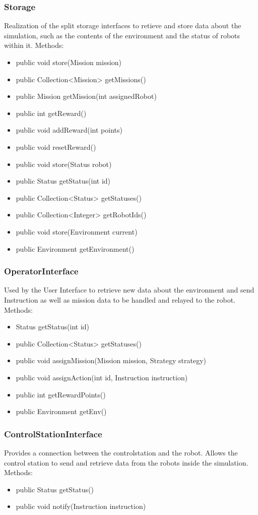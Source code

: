 \subsubsection{Storage}
Realization of the split storage interfaces to retieve and store data about the simulation, such as the contents of the environment and the status of robots within it.
Methods:
\begin{itemize}
    \item  public void store(Mission mission)
    \item  public Collection<Mission> getMissions()
    \item public Mission getMission(int assignedRobot)
    \item public int getReward()
    \item public void addReward(int points)
    \item public void resetReward()
    \item public void store(Status robot)
    \item public Status getStatus(int id)
    \item public Collection<Status> getStatuses()
    \item public Collection<Integer> getRobotIds()
    \item public void store(Environment current)
    \item public Environment getEnvironment()
\end{itemize}

\subsubsection{OperatorInterface}
Used by the User Interface to retrieve new data about the environment and send Instruction as well as mission data to be handled and relayed to the robot.
Methods:
\begin{itemize}
    \item Status getStatus(int id)
    \item public Collection<Status> getStatuses()
    \item public void assignMission(Mission mission, Strategy strategy)
    \item public void assignAction(int id, Instruction instruction)
    \item public int getRewardPoints() 
    \item public Environment getEnv()
\end{itemize}

\subsubsection{ControlStationInterface}
Provides a connection between the controlstation and the robot. Allows the control station to send and retrieve data from the robots inside the simulation.
Methods:
\begin{itemize}
    \item public Status getStatus()
	\item public void notify(Instruction instruction)
\end{itemize}

